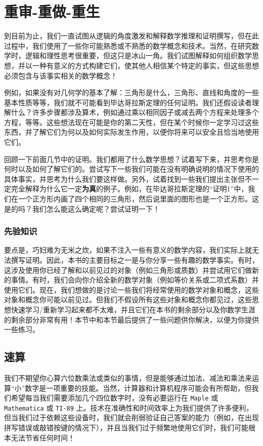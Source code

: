 \section{重审-重做-重生}\label{sec:section1.3}

到目前为止，我们一直试图从逻辑的角度激发和解释数学推理和证明撰写，但在此过程中，我们使用了一些你可能熟悉或不熟悉的数学概念和技术。当然，在研究数学时，逻辑和理性思考很重要，但这只是冰山一角。我们试图解释如何组织数学思想，并以一种有意义的方式构建它们，使其他人相信某个特定的事实，但这些思想必须包含与该事实相关的数学概念！

例如，如果没有对几何学的基本了解：三角形是什么，三角形、直线和角度的一些基本性质等等，我们就不可能看到毕达哥拉斯定理的任何证明。我们还假设读者理解什么？许多步骤都涉及算术，例如通过乘以相同因子或减去两个方程来处理多个方程，等等。这些想法现在可能是你的第二天性，但在某个时候你一定学习过这些东西，并了解它们为何以及如何实际发生作用，以便你将来可以安全且恰当地使用它们。

回顾一下前面几节中的证明。我们都用了什么数学思想？试着写下来，并思考你是何时以及如何了解它们的。尝试写下一些我们可能在没有明确说明的情况下使用的具体事实，并思考为什么我们要这样做。另外，试着找到一些我们提出主张但不一定完全解释为什么它一定\textbf{为真}的例子。例如，在毕达哥拉斯定理的“证明1”中，我们在一个正方形内画了四个相同的三角形，然后说里面的图形也是一个正方形。这是的吗？我们怎么能这么确定呢？尝试证明一下！

\subsubsection*{先验知识}

要点是，巧妇难为无米之炊，如果不注入一些有意义的数学内容，我们实际上就无法撰写证明。因此，本书的主要目标之一是与你分享一些有趣的数学事实。有时，这涉及使用你已经了解和以前见过的对象（例如三角形或质数）并尝试用它们做新的事情。有时，我们会向你介绍全新的数学对象（例如等价关系或二项式系数）并使用它们。现在，我们想做的是讨论一些我们将经常使用的数学对象和概念，这些对象和概念你可能以前见过。但我们不假设所有这些对象和概念你都见过，这些思想快速学习/重新学习起来都不太难，并且它们在本书的剩余部分以及你数学生涯的剩余部分非常有用！本节中和本节最后提供了一些问题供你解决，以便为你提供一些练习。

\subsection{速算}

我们不期望你心算六位数乘法或类似的事情，但是能够通过加法、减法和乘法来运算“小”数字是一项重要的技能。当然，计算器和计算机程序可能会有所帮助，但我们希望每当我们需要添加几个四位数字时，没有必要运行在 \verb|Maple| 或 \verb|Mathematica| 或 \verb|TI-89| 上。技术在准确性和时间效率上为我们提供了许多便利，但当我们过于依赖这些设备时，我们就会削弱验证自己答案的能力（例如，在出现拼写错误或敲错按键的情况下），并且当我们过于频繁地使用它们时，我们可能根本无法节省任何时间！

